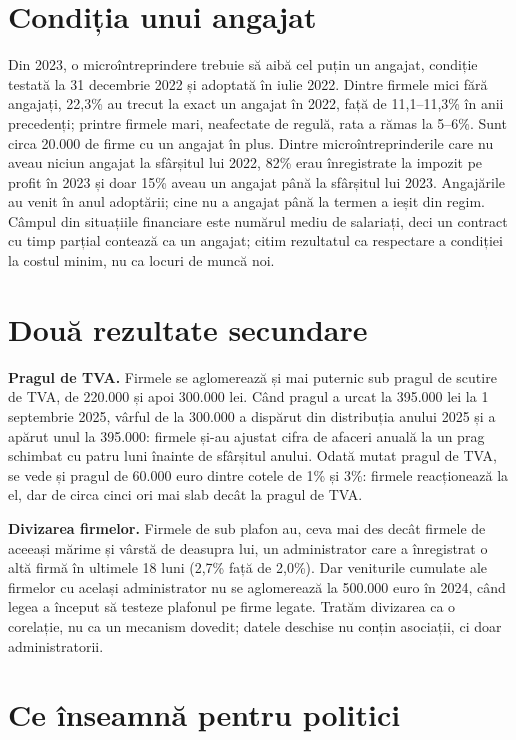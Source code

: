 \documentclass[11pt]{article}
\begin{document}
\section{Condiția unui angajat}

Din 2023, o microîntreprindere trebuie să aibă cel puțin un angajat, condiție testată la 31 decembrie 2022 și adoptată în iulie 2022. Dintre firmele mici fără angajați, 22,3\% au trecut la exact un angajat în 2022, față de 11,1--11,3\% în anii precedenți; printre firmele mari, neafectate de regulă, rata a rămas la 5--6\%. Sunt circa 20.000 de firme cu un angajat în plus. Dintre microîntreprinderile care nu aveau niciun angajat la sfârșitul lui 2022, 82\% erau înregistrate la impozit pe profit în 2023 și doar 15\% aveau un angajat până la sfârșitul lui 2023. Angajările au venit în anul adoptării; cine nu a angajat până la termen a ieșit din regim. Câmpul din situațiile financiare este numărul mediu de salariați, deci un contract cu timp parțial contează ca un angajat; citim rezultatul ca respectare a condiției la costul minim, nu ca locuri de muncă noi.

\section{Două rezultate secundare}

\textbf{Pragul de TVA.} Firmele se aglomerează și mai puternic sub pragul de scutire de TVA, de 220.000 și apoi 300.000 lei. Când pragul a urcat la 395.000 lei la 1 septembrie 2025, vârful de la 300.000 a dispărut din distribuția anului 2025 și a apărut unul la 395.000: firmele și-au ajustat cifra de afaceri anuală la un prag schimbat cu patru luni înainte de sfârșitul anului. Odată mutat pragul de TVA, se vede și pragul de 60.000 euro dintre cotele de 1\% și 3\%: firmele reacționează la el, dar de circa cinci ori mai slab decât la pragul de TVA.

\textbf{Divizarea firmelor.} Firmele de sub plafon au, ceva mai des decât firmele de aceeași mărime și vârstă de deasupra lui, un administrator care a înregistrat o altă firmă în ultimele 18 luni (2,7\% față de 2,0\%). Dar veniturile cumulate ale firmelor cu același administrator nu se aglomerează la 500.000 euro în 2024, când legea a început să testeze plafonul pe firme legate. Tratăm divizarea ca o corelație, nu ca un mecanism dovedit; datele deschise nu conțin asociații, ci doar administratorii.

\section{Ce înseamnă pentru politici}
\end{document}
